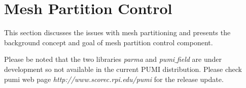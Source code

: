 \section{Mesh Partition Control}  

This section discusses the issues with mesh partitioning and presents the background concept and goal of mesh partition control component.

Please be noted that the two libraries \emph{parma} and \emph{pumi$\_$field} are under development so not available in the current PUMI distribution. Please check pumi web page \textit{http://www.scorec.rpi.edu/pumi} for the release update.


